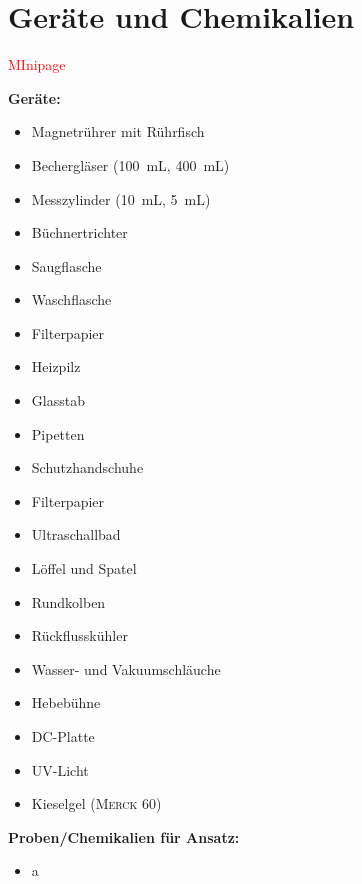 \section{Geräte und Chemikalien}
\label{sec:geraete}

\textcolor{red}{MInipage}

\textbf{Geräte:}
\begin{itemize}
	\item Magnetrührer mit Rührfisch
	\item Bechergläser (\SI{100}{\milli \liter}, \SI{400}{\milli \liter})
	\item Messzylinder (\SI{10}{\milli \liter}, \SI{5}{\milli \liter})
	\item Büchnertrichter
	\item Saugflasche
	\item Waschflasche
	\item Filterpapier
	\item Heizpilz
	\item Glasstab
	\item Pipetten
	\item Schutzhandschuhe
	\item Filterpapier
	\item Ultraschallbad
	\item Löffel und Spatel
	\item Rundkolben
	\item Rückflusskühler
	\item Wasser- und Vakuumschläuche
	\item Hebebühne
	\item DC-Platte
	\item UV-Licht
	\item Kieselgel (\textsc{Merck} 60)
\end{itemize}

\vspace*{5mm}

\textbf{Proben/Chemikalien für Ansatz:}
\begin{itemize}
	\item a
\end{itemize}

\vspace*{5mm}

